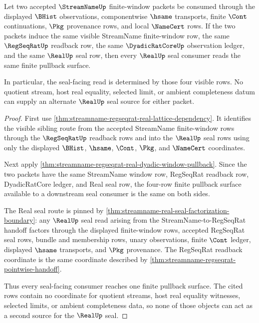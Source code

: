 \begin{theorem}
\label{thm:streamname-regseqrat-real-dyadic-pullback-seal-determinacy}
Let two accepted $\StreamNameUp$ finite-window packets be consumed through the displayed $\BHist$ observations, componentwise $\hsame$ transports, finite $\Cont$ continuations, $\Pkg$ provenance rows, and local $\NameCert$ rows. If the two packets induce the same visible StreamName finite-window row, the same $\RegSeqRatUp$ readback row, the same $\DyadicRatCoreUp$ observation ledger, and the same $\RealUp$ seal row, then every $\RealUp$ seal consumer reads the same finite pullback surface.

In particular, the seal-facing read is determined by those four visible rows. No quotient stream, host real equality, selected limit, or ambient completeness datum can supply an alternate $\RealUp$ seal source for either packet.
\end{theorem}
\begin{proof}
First use \autoref{thm:streamname-regseqrat-real-lattice-dependency}. It identifies the visible sibling route from the accepted StreamName finite-window rows through the $\RegSeqRatUp$ readback rows and into the $\RealUp$ seal rows using only the displayed $\BHist$, $\hsame$, $\Cont$, $\Pkg$, and $\NameCert$ coordinates.

Next apply \autoref{thm:streamname-regseqrat-real-dyadic-window-pullback}. Since the two packets have the same StreamName window row, RegSeqRat readback row, DyadicRatCore ledger, and Real seal row, the four-row finite pullback surface available to a downstream seal consumer is the same on both sides.

The Real seal route is pinned by \autoref{thm:streamname-real-seal-factorization-boundary}: any $\RealUp$ seal read arising from the StreamName-to-RegSeqRat handoff factors through the displayed finite-window rows, accepted RegSeqRat seal rows, bundle and membership rows, unary observations, finite $\Cont$ ledger, displayed $\hsame$ transports, and $\Pkg$ provenance. The RegSeqRat readback coordinate is the same coordinate described by \autoref{thm:streamname-regseqrat-pointwise-handoff}.

Thus every seal-facing consumer reaches one finite pullback surface. The cited rows contain no coordinate for quotient streams, host real equality witnesses, selected limits, or ambient completeness data, so none of those objects can act as a second source for the $\RealUp$ seal.
\end{proof}

